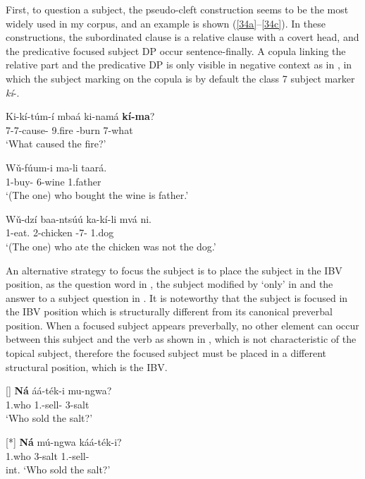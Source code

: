 \documentclass[output=paper,colorlinks,citecolor=brown,
]{langscibook}
\begin{document}
First, to question a subject, the pseudo-cleft construction seems to be the most widely used in my corpus, and an example is shown (\ref{34a}--\ref{34c}). In these constructions, the subordinated clause is a relative clause with a covert head, and the predicative focused subject DP occur sentence-finally. A copula linking the relative part and the predicative DP is only visible in negative context as in , in which the subject marking on the copula is by default the class 7 subject marker \textit{kí}-.
\begin{exe}
    \ex \label{34}
    \begin{xlist}
\ex
\label{34a}
\gll
Ki-kí-túm-í mbaá ki-namá \textbf{kí-ma}?\\
7\Rel{}-7\Sm{}-cause-\Pst{} 9.fire \Inf{}-burn 7-what\\
\trans ‘What caused the fire?’

\ex
\label{34b}
\gll
Wǔ-fúum-i ma-li taará.\\
1\Rel{}-buy-\Pst{} 6-wine 1.father\\
\trans ‘(The one) who bought the wine is father.’

\ex
\label{34c}
\gll
Wǔ-dzí baa-ntsúú ka-kí-li mvá ni.\\
1\Rel{}-eat.\Pst{} 2-chicken \Neg{}-7\Sm{}-\Cop{} 1.dog \Neg{}\\
\trans ‘(The one) who ate the chicken was not the dog.’

    \end{xlist}
\end{exe}
An alternative strategy to focus the subject is to place the subject in the IBV position, as the question word in , the subject modified by `only' in  and the answer to a subject question in . It is noteworthy that the subject is focused in the IBV position which is structurally different from its canonical preverbal position. When a focused subject appears preverbally, no other element can occur between this subject and the verb as shown in , which is not characteristic of the topical subject, therefore the focused subject must be placed in a different structural position, which is the IBV.
\begin{exe}
    \ex \label{35}
    \begin{xlist}
\ex
[]{
\label{35a}
\gll
\textbf{Ná} áá-t\'{e}k-i mu-ngwa?\\
1.who 1\Sm{}.\Pst{}-sell-\Pst{} 3-salt\\
\trans ‘Who sold the salt?’
}

\ex
[*]{
\label{35b}
\gll
\textbf{Ná} mú-ngwa káá-t\'{e}k-i?\\
1.who 3-salt 1\Sm{}.\Pst{}-sell-\Pst{}\\
\trans int. ‘Who sold the salt?’
}

    \end{xlist}
\end{exe}
\end{document}
